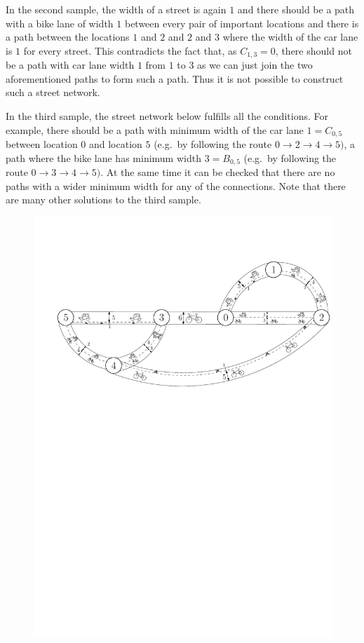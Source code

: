 In the second sample, the width of a street is again $1$ and there should be
a path with a bike lane of width $1$ between every pair
of important locations and there is a path between the locations $1$ and $2$ and $2$
and $3$ where the width of the car lane is $1$ for every street. This
contradicts the fact that, as $C_{1,3}=0$, there should not be a path with car lane width $1$
from  $1$ to $3$ as we can just join the two aforementioned paths to form such
a path. Thus it is not possible to construct such a street network.

In the third sample, the street network below fulfills all the conditions.
For example, there should be a path with minimum width of the car lane $1 = C_{0,5}$ 
between location $0$ and location $5$ (e.g.~by following the route $0\to 2\to 4 \to 5)$, 
a path where the bike lane has minimum width $3 = B_{0,5}$ (e.g.~by following the route $0\to 3 \to 4 \to 5)$. 
At the same time it can be checked that there are no paths with a wider minimum width for any of the connections. 
Note that there are many other solutions to the third sample.
\begin{figure}[h]
  \centering
  \includegraphics[width=.95\textwidth]{sample.pdf}
\end{figure}
